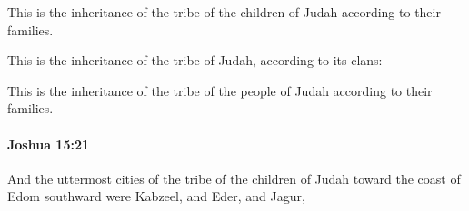 			\begin{versebox}
					\item[BHS] 
					\item[ASV] This is the inheritance of the tribe of the children of Judah according to their families.
					\item[NIV] This is the inheritance of the tribe of Judah, according to its clans:
					\item[NRSV] This is the inheritance of the tribe of the people of Judah according to their families.
			\end{versebox}

		\paragraph{Joshua 15:21} %
			\label{JOSHUA-15-21}

			And the uttermost cities of the tribe of the children of Judah toward the coast of Edom southward were Kabzeel, and Eder, and Jagur,

